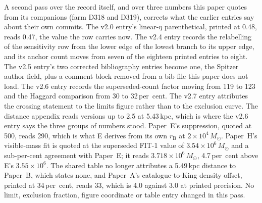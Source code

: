 \documentclass[11pt]{article}
\newcommand{\msun}{\ensuremath{M_\odot}}
\begin{document}
\begin{itemize}
A second pass over the record itself, and over three numbers this paper quotes from its companions (farm D318 and D319), corrects what the earlier entries say about their own commits. The v2.0 entry's linear-$\eta$ parenthetical, printed at 0.48, reads 0.47, the value the row carries now. The v2.4 entry records the relabelling of the sensitivity row from the lower edge of the \citet{XieYuan2012} lowest branch to its upper edge, and its anchor count moves from seven of the eighteen printed entries to eight. The v2.5 entry's two corrected bibliography entries become one, the Spitzer author field, plus a comment block removed from a bib file this paper does not load. The v2.6 entry records the superseded-count factor moving from 119 to 123 and the Haggard comparison from 30 to 32\,per~cent. The v2.7 entry attributes the crossing statement to the limits figure rather than to the exclusion curve. The distance appendix reads versions up to 2.5 at 5.43\,kpc, which is where the v2.6 entry says the three groups of numbers stood. Paper~E's suppression, quoted at 500, reads 290, which is what E derives from its own $r_{\mathrm{B}}$ at $2\times10^{4}\,\msun$. Paper~H's visible-mass fit is quoted at the superseded FIT-1 value of $3.54\times10^{6}\,\msun$ and a sub-per-cent agreement with Paper~E; it reads $3.718\times10^{6}\,\msun$, 4.7\,per~cent above E's $3.55\times10^{6}$. The shared table no longer attributes a 5.49\,kpc distance to Paper~B, which states none, and Paper~A's catalogue-to-King density offset, printed at 34\,per~cent, reads 33, which is 4.0 against 3.0 at printed precision. No limit, exclusion fraction, figure coordinate or table entry changed in this pass.


\end{itemize}
\end{document}
